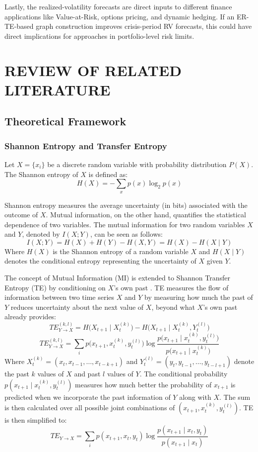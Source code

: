 \documentclass[12pt,oneside]{report}
\begin{document}
Lastly, the realized-volatility forecasts are direct inputs to different
finance applications like Value-at-Risk, options pricing, and dynamic
hedging. If an ER-TE-based graph construction improves crisis-period RV
forecasts, this could have direct implications for approaches in
portfolio-level risk limits.

\chapter{REVIEW OF RELATED LITERATURE}\label{ch:rrl}

\section{Theoretical Framework}

\subsection{Shannon Entropy and Transfer Entropy}

Let $X = \{x_i\}$ be a discrete random variable with probability
distribution $P(X)$. The Shannon entropy of $X$ is defined as:
\[
  H(X) = -\sum_{x} p(x)\log_{2} p(x)
\]

Shannon entropy measures the average uncertainty (in bits) associated
with the outcome of $X$. Mutual information, on the other hand,
quantifies the statistical dependence of two variables. The mutual
information for two random variables $X$ and $Y$, denoted by $I(X;Y)$,
can be seen as follows:
\[
  I(X;Y) = H(X) + H(Y) - H(X,Y) = H(X) - H(X \mid Y)
\]
Where $H(X)$ is the Shannon entropy of a random variable $X$ and
$H(X \mid Y)$ denotes the conditional entropy representing the
uncertainty of $X$ given $Y$.

The concept of Mutual Information (MI) is extended to Shannon Transfer
Entropy (TE) by conditioning on $X$'s own past \cite{schreiber2000}. TE
measures the flow of information between two time series $X$ and $Y$ by
measuring how much the past of $Y$ reduces uncertainty about the next
value of $X$, beyond what $X$'s own past already provides:
\[
  TE_{Y \rightarrow X}^{(k,l)}
    = H\bigl(X_{t+1} \mid X_{t}^{(k)}\bigr)
    - H\bigl(X_{t+1} \mid X_{t}^{(k)}, Y_{t}^{(l)}\bigr)
\]
\[
  TE_{Y \rightarrow X}^{(k,l)}
    = \sum_{i} p\bigl(x_{t+1}, x_{t}^{(k)}, y_{t}^{(l)}\bigr)
      \log\frac{p\bigl(x_{t+1} \mid x_{t}^{(k)}, y_{t}^{(l)}\bigr)}
               {p\bigl(x_{t+1} \mid x_{t}^{(k)}\bigr)}
\]
Where $X_{t}^{(k)} = (x_{t}, x_{t-1}, \ldots, x_{t-k+1})$ and
$Y_{t}^{(l)} = (y_{t}, y_{t-1}, \ldots, y_{t-l+1})$ denote the past $k$
values of $X$ and past $l$ values of $Y$. The conditional probability
$p(x_{t+1} \mid x_{t}^{(k)}, y_{t}^{(l)})$ measures how much better the
probability of $x_{t+1}$ is predicted when we incorporate the past
information of $Y$ along with $X$. The sum is then calculated over all
possible joint combinations of $(x_{t+1}, x_{t}^{(k)}, y_{t}^{(l)})$. TE
is then simplified to:
\[
  TE_{Y \rightarrow X}
    = \sum_{i} p(x_{t+1}, x_{t}, y_{t})
      \log\frac{p(x_{t+1} \mid x_{t}, y_{t})}{p(x_{t+1} \mid x_{t})}
\]
\end{document}
